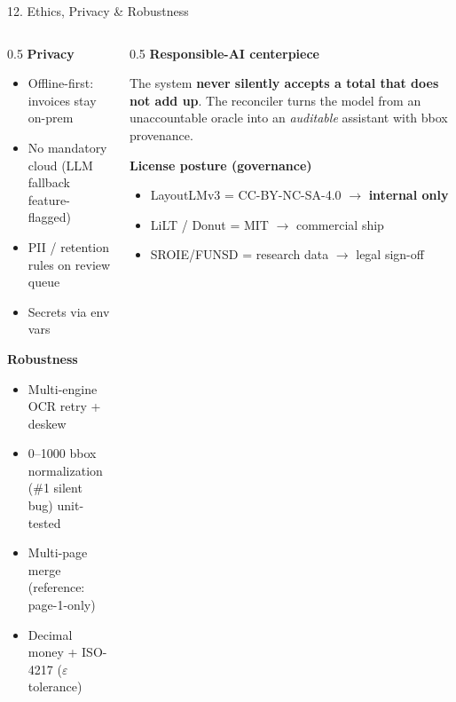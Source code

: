 \documentclass[10pt,aspectratio=169]{beamer}
\begin{document}
\begin{frame}{12. Ethics, Privacy \& Robustness}
\begin{columns}[T]
\begin{column}{0.5\textwidth}
\textbf{Privacy}
\begin{itemize}\small
  \item Offline-first: invoices stay on-prem
  \item No mandatory cloud (LLM fallback feature-flagged)
  \item PII / retention rules on review queue
  \item Secrets via env vars
\end{itemize}

\textbf{Robustness}
\begin{itemize}\small
  \item Multi-engine OCR retry + deskew
  \item 0--1000 bbox normalization (\#1 silent bug) unit-tested
  \item Multi-page merge (reference: page-1-only)
  \item Decimal money + ISO-4217 ($\varepsilon$ tolerance)
\end{itemize}
\end{column}
\begin{column}{0.5\textwidth}
\textbf{Responsible-AI centerpiece}
\begin{block}{}\small
The system \textbf{never silently accepts a total that does not add up}. The reconciler turns the model from an unaccountable oracle into an \emph{auditable} assistant with bbox provenance.
\end{block}

\textbf{License posture (governance)}
\begin{itemize}\small
  \item LayoutLMv3 = CC-BY-NC-SA-4.0 $\to$ \textbf{internal only}
  \item LiLT / Donut = MIT $\to$ commercial ship
  \item SROIE/FUNSD = research data $\to$ legal sign-off
\end{itemize}
\end{column}
\end{columns}
\end{frame}
\end{document}
